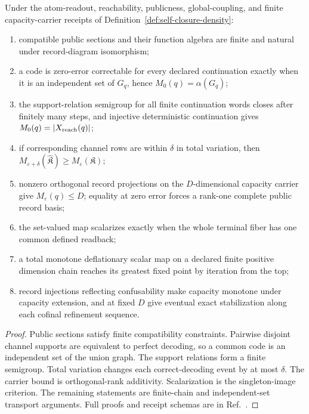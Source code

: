 \begin{theorem}
\label{thm:conditional-operational-n-closure}
Under the atom-readout, reachability, publicness, global-coupling, and finite
capacity-carrier receipts of Definition~\ref{def:self-closure-density}:
\begin{enumerate}[leftmargin=2em,label=(\roman*)]
\item compatible public sections and their function algebra are finite and
natural under record-diagram isomorphism;
\item a code is zero-error correctable for every declared continuation exactly
when it is an independent set of \(G_q\), hence \(M_0(q)=\alpha(G_q)\);
\item the support-relation semigroup for all finite continuation words closes
after finitely many steps, and injective deterministic continuation gives
\(M_0(q)=|X_{\rm reach}(q)|\);
\item if corresponding channel rows are within \(\delta\) in total variation,
then \(M_{\varepsilon+\delta}(\widehat{\mathfrak K})
\ge M_\varepsilon(\mathfrak K)\);
\item nonzero orthogonal record projections on the \(D\)-dimensional capacity
carrier give \(M_\varepsilon(q)\le D\); equality at zero error forces a
rank-one complete public record basis;
\item the set-valued map scalarizes exactly when the whole terminal fiber has
one common defined readback;
\item a total monotone deflationary scalar map on a declared finite positive
dimension chain reaches its greatest fixed point by iteration from the top;
\item record injections reflecting confusability make capacity monotone under
capacity extension, and at fixed \(D\) give eventual exact stabilization
along each cofinal refinement sequence.
\end{enumerate}
\end{theorem}

\begin{proof}
Public sections satisfy finite compatibility constraints. Pairwise disjoint
channel supports are equivalent to perfect decoding, so a common code is an
independent set of the union graph. The support relations form a finite
semigroup. Total variation changes each correct-decoding event by at most
\(\delta\). The carrier bound is orthogonal-rank additivity. Scalarization is
the singleton-image criterion. The remaining statements are finite-chain and
independent-set transport arguments. Full proofs and receipt schemas are in
Ref.~\cite{ophsynthesis}.
\end{proof}

